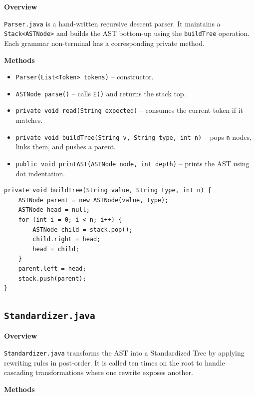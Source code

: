 \documentclass[12pt,a4paper]{article}
\begin{document}
\textbf{Overview}

\texttt{Parser.java} is a hand-written recursive descent parser. It maintains a \texttt{Stack<ASTNode>} and builds the AST bottom-up using the \texttt{buildTree} operation. Each grammar non-terminal has a corresponding private method.

\textbf{Methods}

\begin{itemize}
    \item \texttt{Parser(List<Token> tokens)} -- constructor.
    \item \texttt{ASTNode parse()} -- calls \texttt{E()} and returns the stack top.
    \item \texttt{private void read(String expected)} -- consumes the current token if it matches.
    \item \texttt{private void buildTree(String v, String type, int n)} -- pops \texttt{n} nodes, links them, and pushes a parent.
    \item \texttt{public void printAST(ASTNode node, int depth)} -- prints the AST using dot indentation.
\end{itemize}

\begin{lstlisting}[style=javacode, caption={Parser.buildTree()}]
private void buildTree(String value, String type, int n) {
    ASTNode parent = new ASTNode(value, type);
    ASTNode head = null;
    for (int i = 0; i < n; i++) {
        ASTNode child = stack.pop();
        child.right = head;
        head = child;
    }
    parent.left = head;
    stack.push(parent);
}
\end{lstlisting}

\subsection{\texttt{Standardizer.java}}

\textbf{Overview}

\texttt{Standardizer.java} transforms the AST into a Standardized Tree by applying rewriting rules in post-order. It is called ten times on the root to handle cascading transformations where one rewrite exposes another.

\textbf{Methods}
\end{document}

